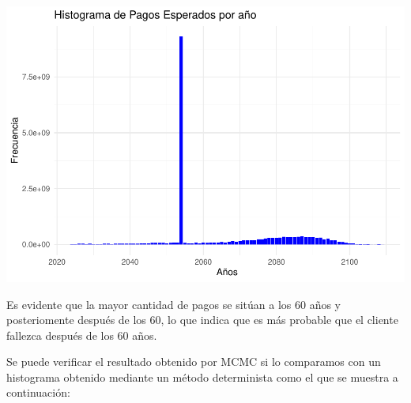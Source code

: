 \documentclass[
]{article}
\begin{document}
\includegraphics{Rmarkdown_files/figure-latex/unnamed-chunk-8-1.pdf}

Es evidente que la mayor cantidad de pagos se sitúan a los 60 años y
posteriomente después de los 60, lo que indica que es más probable que
el cliente fallezca después de los 60 años.

Se puede verificar el resultado obtenido por MCMC si lo comparamos con
un histograma obtenido mediante un método determinista como el que se
muestra a continuación:
\end{document}
